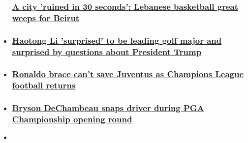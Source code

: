 \begin{itemize}
{  \subsubsection{\texorpdfstring{\href{/2020/08/08/sport/fadi-el-khatib-lebanese-tiger-beirut-blast-spt-intl/index.html}{A
  city 'ruined in 30 seconds': Lebanese basketball great weeps for
  Beirut}}{A city 'ruined in 30 seconds': Lebanese basketball great weeps for Beirut}}\label{a-city-ruined-in-30-seconds-lebanese-basketball-great-weeps-for-beirut}}
\item
  \hypertarget{haotong-li-surprised-to-be-leading-golf-major-and-surprised-by-questions-about-president-trump}{%
  \subsubsection{\texorpdfstring{\href{/2020/08/08/golf/golf-pga-haotong-trump-koepka-woods-spt-intl/index.html}{Haotong
  Li 'surprised' to be leading golf major and surprised by questions
  about President
  Trump}}{Haotong Li 'surprised' to be leading golf major and surprised by questions about President Trump}}\label{haotong-li-surprised-to-be-leading-golf-major-and-surprised-by-questions-about-president-trump}}
\item
  \hypertarget{ronaldo-brace-cant-save-juventus-as-champions-league-football-returns}{%
  \subsubsection{\texorpdfstring{\href{/2020/08/07/football/juventus-manchester-city-real-madrid-champions-league-spt-intl/index.html}{Ronaldo
  brace can't save Juventus as Champions League football
  returns}}{Ronaldo brace can't save Juventus as Champions League football returns}}\label{ronaldo-brace-cant-save-juventus-as-champions-league-football-returns}}
\item
  \hypertarget{bryson-dechambeau-snaps-driver-during-pga-championship-opening-round-}{%
  \subsubsection{\texorpdfstring{\href{/2020/08/07/golf/pga-championship-first-round-recap-bryson-dechambeau-spt-intl/index.html}{Bryson
  DeChambeau snaps driver during PGA Championship opening round
  }}{Bryson DeChambeau snaps driver during PGA Championship opening round }}\label{bryson-dechambeau-snaps-driver-during-pga-championship-opening-round-}}
\item
  \hypertarget{more-than-60-nfl-players-withdraw-from-2020-season-over-covid-19-concerns}{%
}
\end{itemize}
